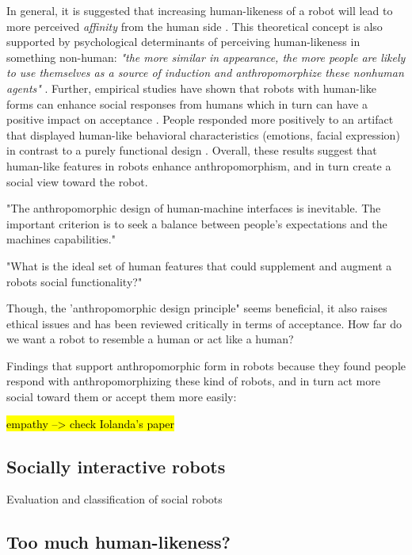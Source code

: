 \documentclass[twocolumn]{svjour3}          %
\begin{document}
	In general, it is suggested that increasing human-likeness of a robot	 will lead to more perceived \textit{affinity} from the human side \cite{mori_uncanny_1970}. This theoretical concept is also supported by psychological determinants of perceiving human-likeness in something non-human: \textit{"the more similar in appearance, the more people are likely to use themselves as a source of induction and anthropomorphize these nonhuman agents"} \cite{epley_seeing_2007}. Further, empirical studies have shown that robots with human-like forms can enhance social responses from humans which in turn can have a positive impact on acceptance \cite{venkatesh_theoretical_2000,duffy_anthropomorphism_2003,goetz_cooperation_2002}.  People responded more positively to an artifact that displayed human-like behavioral characteristics (emotions, facial expression) in contrast to a purely functional design \cite{eyssel_anthropomorphic_2010,krach_can_2008,reeves_media_1996,riek_how_2009}. Overall, these results suggest that human-like features in robots enhance anthropomorphism, and in turn create a social view toward the robot.


	"The anthropomorphic design of human-machine interfaces is inevitable. The important criterion is to seek a balance between people's expectations and the machines capabilities." \cite{duffy_anthropomorphism_2002}

	"What is the ideal set of human features that could supplement and augment a robots  social functionality?" \cite{duffy_anthropomorphism_2002}


	Though, the 'anthropomorphic design principle" seems beneficial, it also raises ethical issues and has been reviewed critically in terms of acceptance. How far do we want a robot to resemble a human or act like a human?

	Findings that support anthropomorphic form in robots because they found people respond with anthropomorphizing these kind of robots, and in turn act more social toward them or accept them more easily:

	\hl{empathy --> check Iolanda's paper}

\subsection{Socially interactive robots}
\label{sec:5.1}

Evaluation and classification of social robots


\subsection{Too much human-likeness?}
\label{sec:5.2}
\end{document}

